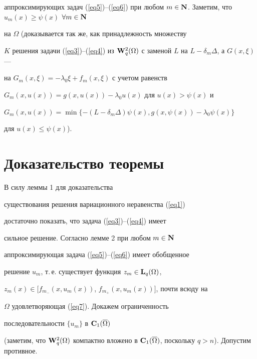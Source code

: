 \begin{pf}
аппроксимирующих задач (\ref{eq5})--(\ref{eq6}) при любом $m\in


{\bold N}$. Заметим, что $u_m(x)\ge\psi(x)$ \; $\forall m\in {\bold N}$


на $\Omega$ (доказывается так же, как принадлежность множеству


$K$ решения задачи (\ref{eq3})--(\ref{eq4}) из ${\bold


W}_q^2(\Omega)$ с заменой $L$ на $L-\delta_m\Delta$, а $G(x,\xi)$ ---


на $G_m(x,\xi)=-\lambda_0\xi+f_m(x,\xi)$ с учетом равенств


$G_m(x,u(x))=g(x,u(x))-\lambda_0u(x)$ для $u(x)>\psi(x)$ и


$G_m(x,u(x))=\min{\{-(L-\delta_m\Delta)


\psi(x),g(x,\psi(x))-\lambda_0\psi(x)\}}$


для $u(x)\le\psi(x)$). 


\end{pf}








\section{Доказательство теоремы}





В силу леммы 1 для доказательства


существования решения вариационного неравенства (\ref{eq1})


достаточно показать, что задача (\ref{eq3})--(\ref{eq4}) имеет


сильное решение. Согласно лемме 2 при любом $m\in{\bold N}$


аппроксимирующая задача (\ref{eq5})--(\ref{eq6}) имеет обобщенное


решение $u_m$, т.\,е. существует функция $z_m\in {\bold L}_q(\Omega)$,


$z_m(x)\in [f_{m_-}(x,u_m(x))$, $f_{m_+}(x,u_m(x))]$, почти всюду на


$\Omega$ удовлетворяющая (\ref{eq7}). Докажем ограниченность


последовательности $\{u_m\}$ в ${\bold C}_1(\overline{\Omega})$


(заметим, что ${\bold W}_q^2(\Omega)$ компактно вложено в ${\bold


C}_1(\overline{\Omega})$, поскольку $q>n$). Допустим противное.



